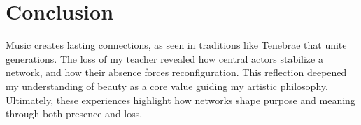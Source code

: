\documentclass{article} %
\begin{document}
\section{Conclusion}

Music creates lasting connections, as seen in traditions like Tenebrae that unite generations. 
The loss of my teacher revealed how central actors stabilize a network, and how their absence forces reconfiguration. 
This reflection deepened my understanding of beauty as a core value guiding my artistic philosophy. 
Ultimately, these experiences highlight how networks shape purpose and meaning through both presence and loss.


%
%


\label{last_page}
\end{document}
